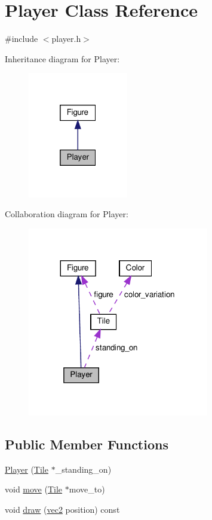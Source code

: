 \hypertarget{classPlayer}{}\section{Player Class Reference}
\label{classPlayer}


{\ttfamily \#include $<$player.\+h$>$}



Inheritance diagram for Player\+:
\nopagebreak
\begin{figure}[H]
\begin{center}
\leavevmode
\includegraphics[width=124pt]{df/da4/classPlayer__inherit__graph}
\end{center}
\end{figure}


Collaboration diagram for Player\+:
\nopagebreak
\begin{figure}[H]
\begin{center}
\leavevmode
\includegraphics[width=224pt]{dc/d25/classPlayer__coll__graph}
\end{center}
\end{figure}
\subsection*{Public Member Functions}
\begin{DoxyCompactItemize}
\item 
\hyperlink{classPlayer_a5a23c2fa4df597d3b41e068f0c54ea8a}{Player} (\hyperlink{classTile}{Tile} $\ast$\+\_\+standing\+\_\+on)
\item 
void \hyperlink{classPlayer_ae330dc5684cee833dede7f3728d60a90}{move} (\hyperlink{classTile}{Tile} $\ast$move\+\_\+to)
\item 
void \hyperlink{classPlayer_adcaf37d2753307e8a7672bd32c441576}{draw} (\hyperlink{structvec2}{vec2} position) const
\end{DoxyCompactItemize}
